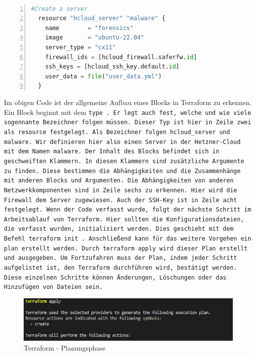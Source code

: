 \begin{otherlanguage}{ngerman}
\newpage
\tt  
\begin{lstlisting}[caption = Block in HCL - Syntax, language=python, numbers=left, numberstyle=\tiny]
  #Create a server
  resource "hcloud_server" "malware" {
    name        = "forensics"
    image       = "ubuntu-22.04"
    server_type = "cx11"
    firewall_ids = [hcloud_firewall.saferfw.id]
    ssh_keys = [hcloud_ssh_key.default.id]
    user_data = file("user_data.yml")
  }
\end{lstlisting}
\rm
\newline
\newline
Im obigen Code ist der allgemeine Aufbau eines Blocks in Terraform zu erkennen. Ein Block beginnt mit dem \tt type \rm . Er legt auch fest, welche und wie viele sogennante Bezeichner folgen müssen. Dieser Typ ist hier in Zeile zwei als \dq resource \dq{} festgelegt. Als Bezeichner folgen \dq hcloud\_server \dq{} und \dq malware\dq{}. Wir definieren hier also einen Server in der Hetzner-Cloud mit dem Namen \dq malware\dq{}. Der Inhalt des Blocks befindet sich in geschweiften Klammern. In diesen Klammern sind zusätzliche Argumente zu finden. Diese bestimmen die Abhängigkeiten und die Zusammenhänge mit anderen Blocks und Argumenten. Die Abhängigkeiten von anderen Netzwerkkomponenten sind in Zeile sechs zu erkennen. Hier wird die Firewall dem Server zugewiesen. Auch der SSH-Key ist in Zeile acht festgelegt.
\newline
Wenn der Code verfasst wurde, folgt der nächste Schritt im Arbeitsablauf von Terraform. Hier sollten die Konfigurationsdateien, die verfasst wurden, initialisiert werden. Dies geschieht mit dem Befehl \tt terraform init \tt. Anschließend kann für das weitere Vorgehen ein plan erstellt werden. Durch \tt terraform apply \rm wird dieser Plan erstellt und ausgegeben. Um Fortzufahren muss der Plan, indem jeder Schritt aufgelistet ist, den Terraform durchführen wird, bestätigt werden. Diese einzelnen Schritte können Änderungen, Löschungen oder das Hinzufügen von Dateien sein.
\newline
\begin{figure}[h]
    \centering
    \includegraphics{LaTeX/graphic/terraformapply.png}
    \caption{Terraform - Planungsphase}
\end{figure}
\newline 
 

\end{otherlanguage}
